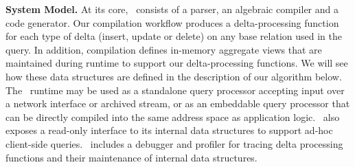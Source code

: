 \noindent\textbf{System Model.}
At its core, \compiler\ consists of a parser, an algebraic compiler and a code
generator. Our compilation workflow produces a delta-processing function for each
type of delta (insert, update or delete) on any base relation used in the query.
In addition, compilation defines in-memory aggregate views that are maintained
during runtime to support our delta-processing functions. We will see how these
data structures are defined in the description of our algorithm below. The
\compiler\ runtime may be used as a standalone query processor accepting input
over a network interface or archived stream, or as an embeddable query processor
that can be directly compiled into the same address space as application logic.
\compiler\ also exposes a read-only interface to its internal data structures to
support ad-hoc client-side queries. \compiler\ includes a debugger and profiler
for tracing delta processing functions and their maintenance of internal data
structures.

